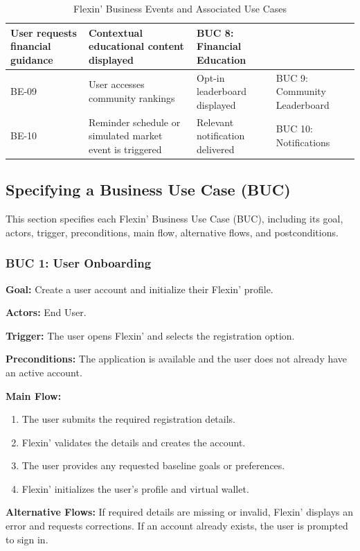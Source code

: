 \documentclass[12pt]{article}
\begin{document}
\begin{table}[H]
\begin{tabularx}{\textwidth}{
        |p{1.2cm}|X|X|p{3.2cm}|}
        User requests financial guidance &
        Contextual educational content displayed &
        BUC 8: Financial Education \\
        \hline
        BE-09 &
        User accesses community rankings &
        Opt-in leaderboard displayed &
        BUC 9: Community Leaderboard \\
        \hline
        BE-10 &
        Reminder schedule or simulated market event is triggered &
        Relevant notification delivered &
        BUC 10: Notifications \\
        \hline
    \end{tabularx}
    \caption{Flexin' Business Events and Associated Use Cases}
    \label{tab:flexin-business-events}
\end{table}

\subsection{Specifying a Business Use Case (BUC)}

This section specifies each Flexin' Business Use Case (BUC), including
its goal, actors, trigger, preconditions, main flow, alternative flows,
and postconditions.

\subsubsection*{BUC 1: User Onboarding}

\textbf{Goal:} Create a user account and initialize their Flexin' profile.

\textbf{Actors:} End User.

\textbf{Trigger:} The user opens Flexin' and selects the registration option.

\textbf{Preconditions:} The application is available and the user does not
already have an active account.

\textbf{Main Flow:}
\begin{enumerate}
    \item The user submits the required registration details.
    \item Flexin' validates the details and creates the account.
    \item The user provides any requested baseline goals or preferences.
    \item Flexin' initializes the user's profile and virtual wallet.
\end{enumerate}

\textbf{Alternative Flows:} If required details are missing or invalid,
Flexin' displays an error and requests corrections. If an account already
exists, the user is prompted to sign in.
\end{document}
